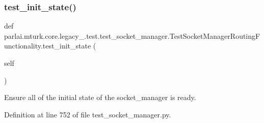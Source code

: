 \subsubsection{\texorpdfstring{test\+\_\+init\+\_\+state()}{test\_init\_state()}}
{\footnotesize\ttfamily def parlai.\+mturk.\+core.\+legacy\+\_.\+test.\+test\+\_\+socket\+\_\+manager.\+Test\+Socket\+Manager\+Routing\+Functionality.\+test\+\_\+init\+\_\+state (\begin{DoxyParamCaption}\item[{}]{self }\end{DoxyParamCaption})}

\begin{DoxyVerb}Ensure all of the initial state of the socket_manager is ready.
\end{DoxyVerb}
 

Definition at line 752 of file test\+\_\+socket\+\_\+manager.\+py.


